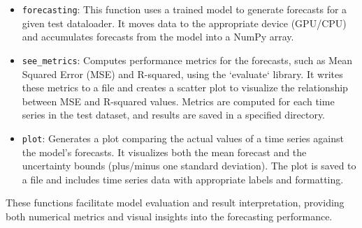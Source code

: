\begin{itemize}
    \item \texttt{forecasting}: This function uses a trained model to generate forecasts for a given test dataloader. It moves data to the appropriate device (GPU/CPU) and accumulates forecasts from the model into a NumPy array.
    
    \item \texttt{see\_metrics}: Computes performance metrics for the forecasts, such as Mean Squared Error (MSE) and R-squared, using the `evaluate` library. It writes these metrics to a file and creates a scatter plot to visualize the relationship between MSE and R-squared values. Metrics are computed for each time series in the test dataset, and results are saved in a specified directory.
    
    \item \texttt{plot}: Generates a plot comparing the actual values of a time series against the model’s forecasts. It visualizes both the mean forecast and the uncertainty bounds (plus/minus one standard deviation). The plot is saved to a file and includes time series data with appropriate labels and formatting.
\end{itemize}

These functions facilitate model evaluation and result interpretation, providing both numerical metrics and visual insights into the forecasting performance.

